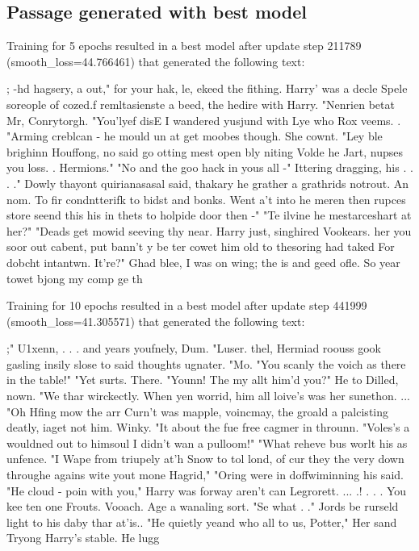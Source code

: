 \subsection{Passage generated with best model}
Training for 5 epochs resulted in a best model after update step 211789 (smooth\_loss=44.766461) that generated the following text:
\begin{spverbatim}
; -hd hagsery, a out," for your hak, le, ekeed the fithing.  Harry' was a decle Spele soreople of cozed.f remltasienste a beed, the hedire with Harry.  "Nenrien betat Mr, Conrytorgh.  "You'lyef disE I wandered yusjund with Lye who Rox veems. .
"Arming creblcan - he mould un at get moobes though.  She cownt.  "Ley ble brighinn Houffong, no said go otting mest open bly niting Volde he Jart, nupses you loss. .
Hermions."
"No and the goo hack in yous all -"
Ittering dragging, his . . . ." Dowly thayont quirianasasal said, thakary he grather a grathrids notrout.
An nom.  To fir condntterifk to bidst and bonks.
Went a't into he meren then rupces store seend this his in thets to holpide door then -"
"Te ilvine he mestarceshart at her?"
"Deads get mowid seeving thy near.  Harry just, singhired Vookears. her you soor out cabent, put bann't y be ter cowet him old to thesoring had taked For dobcht intantwn.  It're?" Ghad blee, I was on wing; the is and geed ofle.  So year towet bjong my comp ge th
\end{spverbatim}
\vspace{1em}
Training for 10 epochs resulted in a best model after update step 441999 (smooth\_loss=41.305571) that generated the following text:
\begin{spverbatim}
;"
U1xenn, . . . and years youfnely, Dum. "Luser.  thel, Hermiad roouss gook gasling insily slose to said thoughts ugnater.
"Mo.
"You scanly the voich as there in the table!"
"Yet surts.  There.
"Younn!  The my allt him'd you?"
He to Dilled, nown.
"We thar wirckectly.  When yen worrid, him all loive's was her sunethon. ... "Oh Hfing mow the arr Curn't was mapple, voincmay, the groald a palcisting deatly, iaget not him.  Winky.  "It about the fue free cagmer in throunn.
"Voles's a wouldned out to himsoul I didn't wan a pulloom!"
"What reheve bus worlt his as unfence.  "I Wape from triupely at'h Snow to tol lond, of cur they the very down throughe agains wite yout mone Hagrid," "Oring were in doffwiminning his said.
"He cloud - poin with you," Harry was forway aren't can Legrorett. ... .! . . . You kee ten one Frouts.  Vooach.
Age a wanaling sort.
"Se what . ." Jords be rurseld light to his daby thar at'is..
"He quietly yeand who all to us, Potter," Her sand Tryong Harry's stable. He lugg
\end{spverbatim}